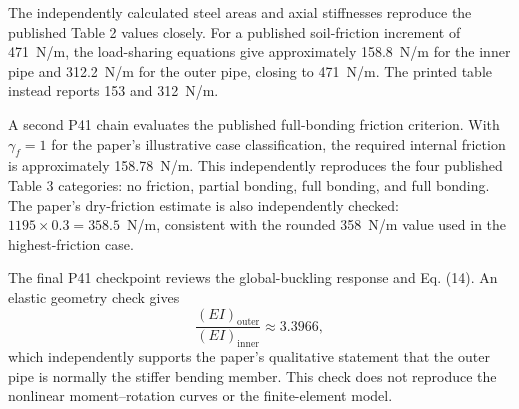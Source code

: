 The independently calculated steel areas and axial stiffnesses reproduce the published Table 2 values closely. For a published soil-friction increment of 471~N/m, the load-sharing equations give approximately 158.8~N/m for the inner pipe and 312.2~N/m for the outer pipe, closing to 471~N/m. The printed table instead reports 153 and 312~N/m.

A second P41 chain evaluates the published full-bonding friction criterion. With $\gamma_f=1$ for the paper's illustrative case classification, the required internal friction is approximately 158.78~N/m. This independently reproduces the four published Table 3 categories: no friction, partial bonding, full bonding, and full bonding. The paper's dry-friction estimate is also independently checked: $1195\times0.3=358.5$~N/m, consistent with the rounded 358~N/m value used in the highest-friction case.

The final P41 checkpoint reviews the global-buckling response and Eq. (14). An elastic geometry check gives
\[
\frac{(EI)_{\mathrm{outer}}}{(EI)_{\mathrm{inner}}}\approx 3.3966,
\]
which independently supports the paper's qualitative statement that the outer pipe is normally the stiffer bending member. This check does not reproduce the nonlinear moment--rotation curves or the finite-element model.
